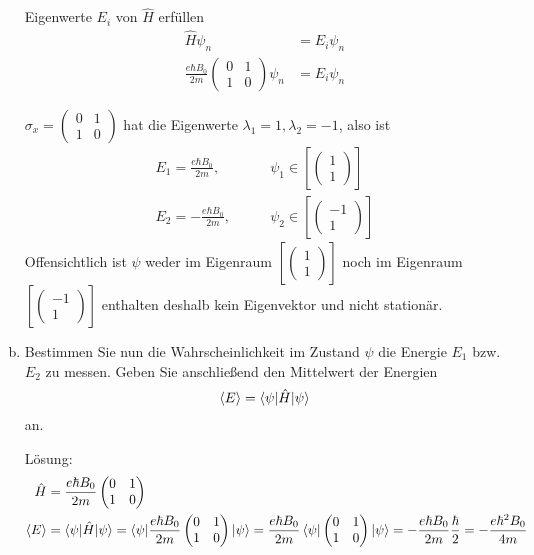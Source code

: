 \documentclass{scrartcl}
\newcommand{\Sx}{\begin{pmatrix}0&1\\1&0\end{pmatrix}}
\newcommand{\vecz}[2]{\begin{pmatrix}#1 \\ #2\end{pmatrix}}
\begin{document}
\begin{enumerate}[a)]
Eigenwerte $E_i$ von $\hat  H$ erfüllen
\begin{align*}
\hat H \psi_n						&= E_i \psi_n			\\
\frac{e\hbar B_0}{2m}\Sx \psi_n
&= 
E_i \psi_n
\end{align*}

$\sigma_x = \begin{pmatrix}0&1\\1&0\end{pmatrix}$ hat die Eigenwerte $\lambda_1 = 1, \lambda_2 = -1$, also ist
\begin{align*}
E_1 =  \frac{e\hbar B_0}{2m}, \qquad& \psi_1 \in \left[\vecz 11 \right]\\
E_2 = -\frac{e\hbar B_0}{2m}, \qquad& \psi_2 \in \left[\vecz {-1}1 \right]
\end{align*}
Offensichtlich ist $\psi$ weder im Eigenraum $\left[\vecz 11 \right]$ noch im Eigenraum $\left[\vecz {-1}1 \right]$ enthalten deshalb kein Eigenvektor und nicht stationär.


\item Bestimmen Sie nun die Wahrscheinlichkeit im Zustand $\psi$ die Energie $E_1$ bzw. $E_2$ zu messen. Geben Sie anschließend den Mittelwert der Energien
\[\braket{E} = \braket{\psi|\hat H|\psi}\]
an.
\item[Lösung:]
\begin{align*}
\hat H &= \frac{e\hbar B_0}{2m}\Sx \\
\braket{E} &= \braket{\psi|\hat H|\psi} = \braket{\psi|\frac{e\hbar B_0}{2m}\Sx|\psi} = \frac{e\hbar B_0}{2m}\braket{\psi|\Sx|\psi} = -\frac{e\hbar B_0}{2m}\frac \hbar 2 = -\frac{e\hbar^2 B_0}{4m}
\end{align*}


\end{enumerate}
\end{document}
